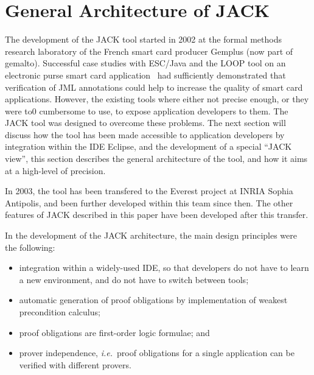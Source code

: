 \section{General Architecture of JACK}\label{SecArchitecture}

The development of the JACK tool started in 2002 at the formal methods
research laboratory of the French smart card producer Gemplus (now
part of gemalto). Successful case studies with ESC/Java and the LOOP
tool on an electronic purse smart card
application~\cite{BreunesseCHJ03} had sufficiently demonstrated that
verification of JML annotations could help to increase the quality of
smart card applications. However, the existing tools where either not
precise enough, or they were to0 cumbersome to use, to expose
application developers to them. The JACK tool was designed to overcome
these problems. The next section will discuss how the tool has been
made accessible to application developers by integration within the
IDE Eclipse, and the development of a special ``JACK view'', this
section describes the general architecture of the tool, and how it
aims at a high-level of precision.

In 2003, the tool has been transfered to the Everest project at INRIA
Sophia Antipolis, and been further developed within this team since
then. The other features of JACK described in this paper have been
developed after this transfer.

In the development of the JACK architecture, the main design
principles were the following:
\begin{itemize}
\item integration within a widely-used IDE, so that developers do not
have to learn a new environment, and do not have to switch between tools;
\item automatic generation of proof obligations by
implementation of weakest precondition calculus;
\item proof obligations are first-order logic formulae; and
\item prover independence, \emph{i.e.}\ proof obligations for
a single application can be verified with different provers.
\end{itemize}


